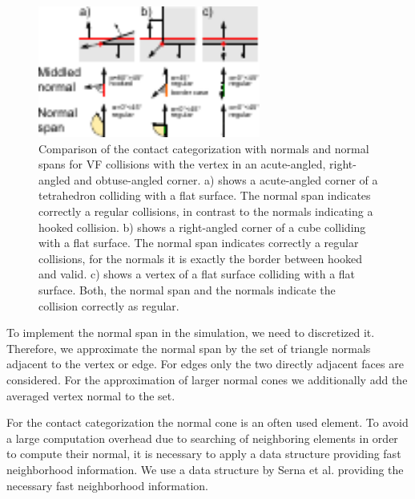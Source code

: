 \begin{figure}[h] 
  \centering
     \includegraphics[width=0.65\textwidth]{pics/pdf/stupidNormals2.pdf}
  \caption[Comparison of the contact categorization with normals and normal spans for VF collisions with the vertex in an acute-angled, right-angled and obtuse-angled corner.]{Comparison of the contact categorization with normals and normal spans for VF collisions with the vertex in an acute-angled, right-angled and obtuse-angled corner. a) shows a acute-angled corner of a tetrahedron colliding with a flat surface. The normal span indicates correctly a regular collisions, in contrast to the normals indicating a hooked collision.  b) shows a  right-angled corner of a cube colliding with a flat surface. The normal span indicates correctly a regular collisions, for the normals it is exactly the border between hooked and valid.  c) shows a vertex of a flat surface colliding with a flat surface. Both, the normal span and the normals indicate the collision correctly as regular.}
  \label{fig::vertexNormalSpanComp}
\end{figure}

To implement the normal span in the simulation, we need to discretized it.
Therefore, we approximate the normal span by the set of triangle normals adjacent to the vertex or edge.
For edges only the two directly adjacent faces are considered. For the approximation of larger normal cones we additionally add the averaged vertex normal to the set.


For the contact categorization the normal cone is an often used element.
To avoid a large computation overhead due to searching of neighboring elements in order to compute their normal, it is necessary to apply a data structure providing fast neighborhood information. 
We use a data structure by Serna et al. \cite{SERNA2009B} providing the necessary fast neighborhood information.


